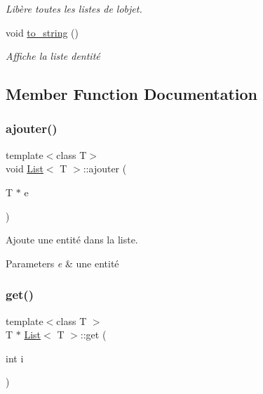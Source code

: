 \begin{DoxyCompactItemize}
\begin{DoxyCompactList}\small\item\em Libère toutes les listes de l\textquotesingle{}objet. \end{DoxyCompactList}\item 
\mbox{\label{classList_ab1e96af549f33f7cebf6ec48b47c3a8a}} 
void \hyperlink{classList_ab1e96af549f33f7cebf6ec48b47c3a8a}{to\+\_\+string} ()
\begin{DoxyCompactList}\small\item\em Affiche la liste d\textquotesingle{}entité \end{DoxyCompactList}\end{DoxyCompactItemize}


\subsection{Member Function Documentation}
\mbox{\label{classList_a9ac31f8b7436b532c00e3cad6d75784c}} 
\subsubsection{\texorpdfstring{ajouter()}{ajouter()}}
{\footnotesize\ttfamily template$<$class T$>$ \\
void \hyperlink{classList}{List}$<$ T $>$\+::ajouter (\begin{DoxyParamCaption}\item[{T $\ast$}]{e }\end{DoxyParamCaption})}



Ajoute une entité dans la liste. 


\begin{DoxyParams}{Parameters}
{\em e} & une entité \\
\hline
\end{DoxyParams}
\mbox{\label{classList_a6806f565edaf5819c0078c3d144bed8b}} 
\subsubsection{\texorpdfstring{get()}{get()}}
{\footnotesize\ttfamily template$<$class T $>$ \\
T $\ast$ \hyperlink{classList}{List}$<$ T $>$\+::get (\begin{DoxyParamCaption}\item[{int}]{i }\end{DoxyParamCaption})}



